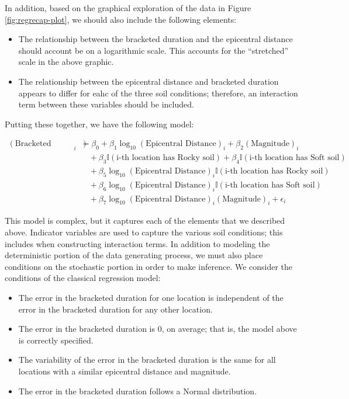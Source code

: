 \documentclass[]{book}
\providecommand{\tightlist}{%
  \setlength{\itemsep}{0pt}\setlength{\parskip}{0pt}}
\theoremstyle{definition}
\theoremstyle{definition}
\theoremstyle{definition}
\theoremstyle{remark}
\begin{document}
In addition, based on the graphical exploration of the data in Figure
\ref{fig:regrecap-plot}, we should also include the following elements:

\begin{itemize}
\tightlist
\item
  The relationship between the bracketed duration and the epicentral
  distance should account be on a logarithmic scale. This accounts for
  the ``stretched'' scale in the above graphic.
\item
  The relationship between the epicentral distance and bracketed
  duration appears to differ for eahc of the three soil conditions;
  therefore, an interaction term between these variables should be
  included.
\end{itemize}

Putting these together, we have the following model:

\begin{equation}
  \begin{aligned}
    (\text{Bracketed Duration})_i &= \beta_0 + \beta_1\log_{10}(\text{Epicentral Distance})_i + \beta_2(\text{Magnitude})_i \\
      &\quad + \beta_3\mathbb{I}(\text{i-th location has Rocky soil}) + \beta_4\mathbb{I}(\text{i-th location has Soft soil}) \\
      &\quad + \beta_5\log_{10}(\text{Epicentral Distance})_i\mathbb{I}(\text{i-th location has Rocky soil}) \\
      &\quad + \beta_6\log_{10}(\text{Epicentral Distance})_i\mathbb{I}(\text{i-th location has Soft soil}) \\
      &\quad + \beta_7\log_{10}(\text{Epicentral Distance})_i(\text{Magnitude})_i + \epsilon_i
  \end{aligned}
  \label{eq:regrecap-model}
\end{equation}

This model is complex, but it captures each of the elements that we
described above. Indicator variables are used to capture the various
soil conditions; this includes when constructing interaction terms. In
addition to modeling the deterministic portion of the data generating
process, we must also place conditions on the stochastic portion in
order to make inference. We consider the conditions of the classical
regression model:

\begin{itemize}
\tightlist
\item
  The error in the bracketed duration for one location is independent of
  the error in the bracketed duration for any other location.
\item
  The error in the bracketed duration is 0, on average; that is, the
  model above is correctly specified.
\item
  The variability of the error in the bracketed duration is the same for
  all locations with a similar epicentral distance and magnitude.
\item
  The error in the bracketed duration follows a Normal distribution.
\end{itemize}
\end{document}
